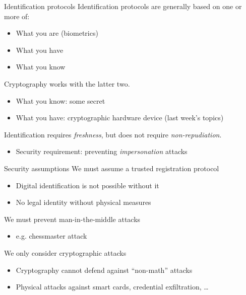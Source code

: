 \begin{frame}{Identification protocols}
  \pause
  Identification protocols are generally based on one or more of:
  \begin{itemize}[<+(1)->]
    \item What you are (biometrics)
    \item What you have
    \item What you know
  \end{itemize}

  \pause
  Cryptography works with the latter two.
  \begin{itemize}[<+(1)->]
    \item What you know: some secret
    \item What you have: cryptographic hardware device (last week's topics)
  \end{itemize}

  \vspace*{1em}

  \pause
  Identification requires \emph{freshness}, but does not require \emph{non-repudiation}.
  \begin{itemize}[<+(1)->]
    \item Security requirement: preventing \emph{impersonation} attacks
  \end{itemize}
\end{frame}

\begin{frame}{Security assumptions}
  \pause
  We must assume a trusted registration protocol
  \begin{itemize}[<+(1)->]
    \item Digital identification is not possible without it
    \item No legal identity without physical measures
  \end{itemize}

  \vspace*{1em}

  \pause
  We must prevent man-in-the-middle attacks
  \begin{itemize}[<+(1)->]
    \item e.g. chessmaster attack
  \end{itemize}

  \vspace*{1em}

  \pause
  We only consider cryptographic attacks
  \begin{itemize}[<+(1)->]
    \item Cryptography cannot defend against \enquote{non-math} attacks
    \item Physical attacks against smart cards, credential exfiltration, \dots
  \end{itemize}
\end{frame}

